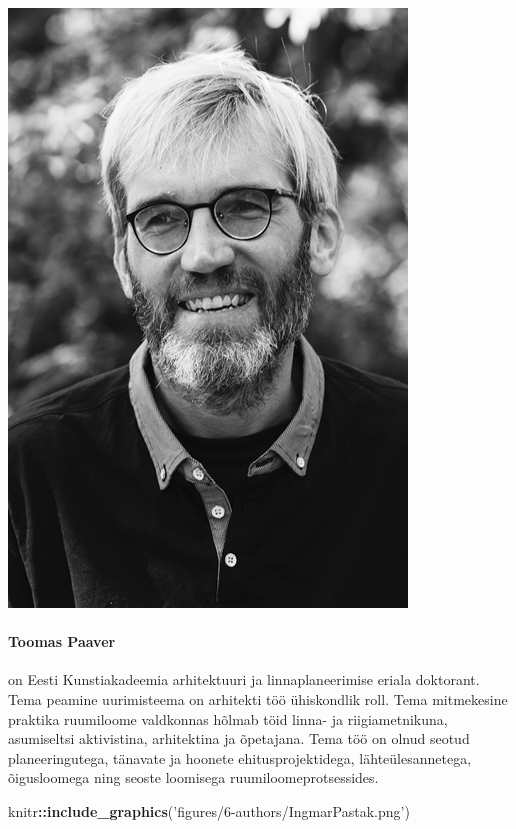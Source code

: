 \documentclass[estonian,]{article}
\newenvironment{Shaded}{\begin{snugshade}}{\end{snugshade}}
\newcommand{\KeywordTok}[1]{\textcolor[rgb]{0.13,0.29,0.53}{\textbf{#1}}}
\newcommand{\NormalTok}[1]{#1}
\newcommand{\OperatorTok}[1]{\textcolor[rgb]{0.81,0.36,0.00}{\textbf{#1}}}
\newcommand{\StringTok}[1]{\textcolor[rgb]{0.31,0.60,0.02}{#1}}
\let\oldparagraph\paragraph
\renewcommand{\paragraph}[1]{\oldparagraph{#1}\mbox{}}
\begin{document}
\begin{flushleft}\includegraphics[width=0.5\linewidth]{figures/6-authors/ToomasPaaver} \end{flushleft}

\hypertarget{toomas-paaver}{%
\paragraph{Toomas Paaver}\label{toomas-paaver}}

on Eesti Kunstiakadeemia arhitektuuri ja linnaplaneerimise eriala doktorant. Tema peamine uurimisteema on arhitekti töö ühiskondlik roll. Tema mitmekesine praktika ruumiloome valdkonnas hõlmab töid linna- ja riigiametnikuna, asumiseltsi aktivistina, arhitektina ja õpetajana. Tema töö on olnud seotud planeeringutega, tänavate ja hoonete ehitusprojektidega, lähteülesannetega, õigusloomega ning seoste loomisega ruumiloomeprotsessides.

\begin{Shaded}
\begin{Highlighting}[]
\NormalTok{knitr}\OperatorTok{::}\KeywordTok{include_graphics}\NormalTok{(}\StringTok{'figures/6-authors/IngmarPastak.png'}\NormalTok{)}
\end{Highlighting}
\end{Shaded}
\end{document}
